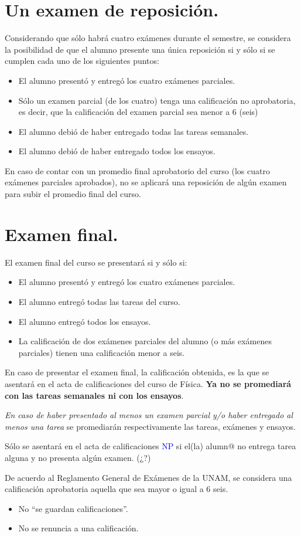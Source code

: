 \documentclass[12pt]{article}
\begin{document}
\section{Un examen de reposición.}
Considerando que sólo habrá cuatro exámenes durante el semestre, se considera la posibilidad de que el alumno presente una única reposición si y sólo si se cumplen cada uno de los siguientes puntos:
\begin{itemize}
\item El alumno presentó y entregó los cuatro exámenes parciales.
\item Sólo un examen parcial (de los cuatro) tenga una calificación no aprobatoria, es decir, que la calificación del examen parcial sea menor a $6$ (seis)
\item El alumno debió de haber entregado todas las tareas semanales.
\item El alumno debió de haber entregado todos los ensayos.
\end{itemize}
En caso de contar con un promedio final aprobatorio del curso (los cuatro exámenes parciales aprobados), no se aplicará una reposición de algún examen para subir el promedio final del curso.
\section{Examen final.}
El examen final del curso se presentará si y sólo si:
\begin{itemize}
\item El alumno presentó y entregó los cuatro exámenes parciales.
\item El alumno entregó todas las tareas del curso.
\item El alumno entregó todos los ensayos.
\item La calificación de dos exámenes parciales del alumno (o más exámenes parciales) tienen una calificación menor a seis.
\end{itemize}
En caso de presentar el examen final, la calificación obtenida, es la que se asentará en el acta de calificaciones del curso de Física. \textbf{Ya no se promediará con las tareas semanales ni con los ensayos}.
\par
\emph{En caso de haber presentado al menos un examen parcial y/o haber entregado al menos una tarea} se promediarán respectivamente las tareas, exámenes y ensayos.


Sólo se asentará en el acta de calificaciones \textcolor{blue}{NP} si el(la) alumn{@} no entrega tarea alguna y no presenta algún examen. (¿?)
\par
De acuerdo al Reglamento General de Exámenes de la UNAM, se considera una calificación aprobatoria aquella que sea mayor o igual a $6$ seis.
\begin{itemize}
\item No \enquote{se guardan calificaciones}.
\item No se renuncia a una calificación.
\end{itemize}
\end{document}

